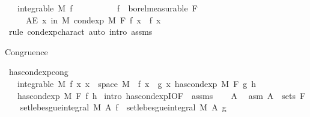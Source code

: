 \begin{isabellebody}
\ \ \ {\isachardoublequoteopen}integrable\ M\ f{\isachardoublequoteclose}\isanewline
\ \ \ \ \ \ \ \ \ \ {\isachardoublequoteopen}f\ {\isasymin}\ borel{\isacharunderscore}{\kern0pt}measurable\ F{\isachardoublequoteclose}\isanewline
\ \ \ \ \ {\isachardoublequoteopen}AE\ x\ in\ M{\isachardot}{\kern0pt}\ cond{\isacharunderscore}{\kern0pt}exp\ M\ F\ f\ x\ {\isacharequal}{\kern0pt}\ f\ x{\isachardoublequoteclose}\isanewline
%
\isadelimproof
\ \ %
\endisadelimproof
%
\isatagproof
{}\isamarkupfalse%
\ {\isacharparenleft}{\kern0pt}rule\ cond{\isacharunderscore}{\kern0pt}exp{\isacharunderscore}{\kern0pt}charact{\isacharcomma}{\kern0pt}\ auto\ intro{\isacharcolon}{\kern0pt}\ assms{\isacharparenright}{\kern0pt}%
\endisatagproof
{\isafoldproof}%
%
\isadelimproof
%
\endisadelimproof
%
\begin{isamarkuptext}%
Congruence%
\end{isamarkuptext}\isamarkuptrue%
\isamarkupfalse%
\ has{\isacharunderscore}{\kern0pt}cond{\isacharunderscore}{\kern0pt}exp{\isacharunderscore}{\kern0pt}cong{\isacharcolon}{\kern0pt}\isanewline
\ \ \ {\isachardoublequoteopen}integrable\ M\ f{\isachardoublequoteclose}\ {\isachardoublequoteopen}{\isasymAnd}x{\isachardot}{\kern0pt}\ x\ {\isasymin}\ space\ M\ {\isasymLongrightarrow}\ f\ x\ {\isacharequal}{\kern0pt}\ g\ x{\isachardoublequoteclose}\ {\isachardoublequoteopen}has{\isacharunderscore}{\kern0pt}cond{\isacharunderscore}{\kern0pt}exp\ M\ F\ g\ h{\isachardoublequoteclose}\isanewline
\ \ \ {\isachardoublequoteopen}has{\isacharunderscore}{\kern0pt}cond{\isacharunderscore}{\kern0pt}exp\ M\ F\ f\ h{\isachardoublequoteclose}\isanewline
%
\isadelimproof
%
\endisadelimproof
%
\isatagproof
{}\isamarkupfalse%
\ {\isacharparenleft}{\kern0pt}intro\ has{\isacharunderscore}{\kern0pt}cond{\isacharunderscore}{\kern0pt}expI{\isacharprime}{\kern0pt}{\isacharbrackleft}{\kern0pt}OF\ {\isacharunderscore}{\kern0pt}\ assms{\isacharparenleft}{\kern0pt}{}{\isacharparenright}{\kern0pt}{\isacharbrackright}{\kern0pt}{\isacharparenright}{\kern0pt}\isanewline
\ \ \isamarkupfalse%
\ A\ \isamarkupfalse%
\ asm{\isacharcolon}{\kern0pt}\ {\isachardoublequoteopen}A\ {\isasymin}\ sets\ F{\isachardoublequoteclose}\isanewline
\ \ \isamarkupfalse%
\ {\isachardoublequoteopen}set{\isacharunderscore}{\kern0pt}lebesgue{\isacharunderscore}{\kern0pt}integral\ M\ A\ f\ {\isacharequal}{\kern0pt}\ set{\isacharunderscore}{\kern0pt}lebesgue{\isacharunderscore}{\kern0pt}integral\ M\ A\ g{\isachardoublequoteclose}\ \isamarkupfalse%

\end{isabellebody}
